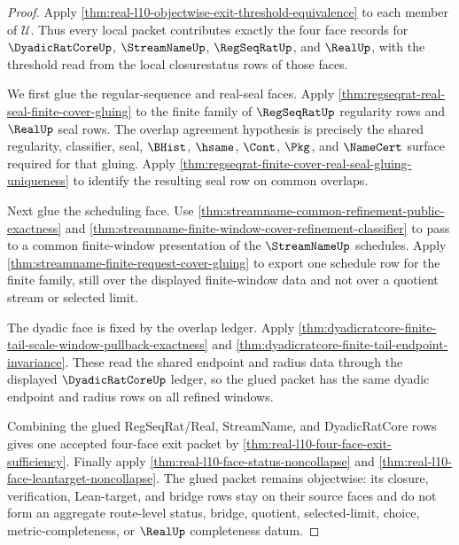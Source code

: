 \begin{proof}
Apply \autoref{thm:real-l10-objectwise-exit-threshold-equivalence} to each
member of $\mathcal{U}$. Thus every local packet contributes exactly the four
face records for $\DyadicRatCoreUp$, $\StreamNameUp$, $\RegSeqRatUp$, and
$\RealUp$, with the threshold read from the local closurestatus rows of those
faces.

We first glue the regular-sequence and real-seal faces. Apply
\autoref{thm:regseqrat-real-seal-finite-cover-gluing} to the finite family of
$\RegSeqRatUp$ regularity rows and $\RealUp$ seal rows. The overlap
agreement hypothesis is precisely the shared regularity, classifier, seal,
$\BHist$, $\hsame$, $\Cont$, $\Pkg$, and $\NameCert$ surface required for that
gluing. Apply
\autoref{thm:regseqrat-finite-cover-real-seal-gluing-uniqueness} to identify
the resulting seal row on common overlaps.

Next glue the scheduling face. Use
\autoref{thm:streamname-common-refinement-public-exactness} and
\autoref{thm:streamname-finite-window-cover-refinement-classifier} to pass to
a common finite-window presentation of the $\StreamNameUp$ schedules. Apply
\autoref{thm:streamname-finite-request-cover-gluing} to export one schedule
row for the finite family, still over the displayed finite-window data and not
over a quotient stream or selected limit.

The dyadic face is fixed by the overlap ledger. Apply
\autoref{thm:dyadicratcore-finite-tail-scale-window-pullback-exactness} and
\autoref{thm:dyadicratcore-finite-tail-endpoint-invariance}. These read the
shared endpoint and radius data through the displayed $\DyadicRatCoreUp$
ledger, so the glued packet has the same dyadic endpoint and radius rows on
all refined windows.

Combining the glued RegSeqRat/Real, StreamName, and DyadicRatCore rows gives
one accepted four-face exit packet by
\autoref{thm:real-l10-four-face-exit-sufficiency}. Finally apply
\autoref{thm:real-l10-face-status-noncollapse} and
\autoref{thm:real-l10-face-leantarget-noncollapse}. The glued packet remains
objectwise: its closure, verification, Lean-target, and bridge rows stay on
their source faces and do not form an aggregate route-level status, bridge,
quotient, selected-limit, choice, metric-completeness, or $\RealUp$
completeness datum.
\end{proof}

